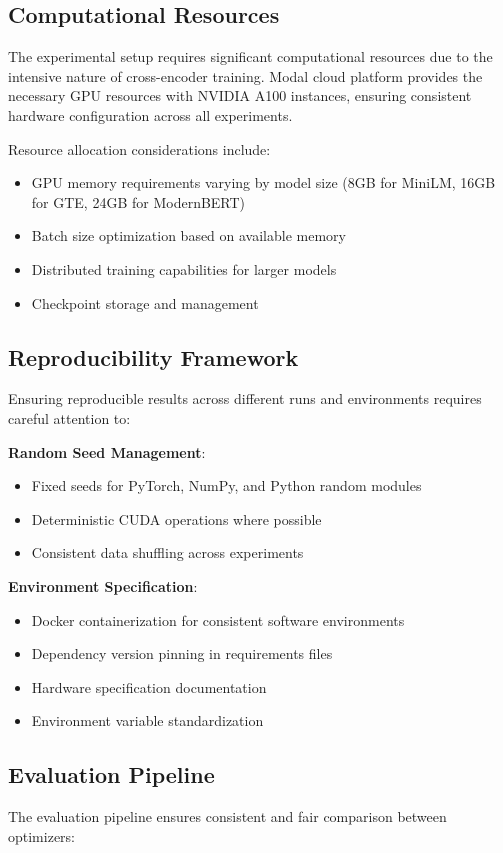 \subsection{Computational Resources}
The experimental setup requires significant computational resources due to the intensive nature of cross-encoder training. Modal cloud platform provides the necessary GPU resources with NVIDIA A100 instances, ensuring consistent hardware configuration across all experiments.

Resource allocation considerations include:
\begin{itemize}
    \item GPU memory requirements varying by model size (8GB for MiniLM, 16GB for GTE, 24GB for ModernBERT)
    \item Batch size optimization based on available memory
    \item Distributed training capabilities for larger models
    \item Checkpoint storage and management
\end{itemize}

\subsection{Reproducibility Framework}
Ensuring reproducible results across different runs and environments requires careful attention to:

\textbf{Random Seed Management}:
\begin{itemize}
    \item Fixed seeds for PyTorch, NumPy, and Python random modules
    \item Deterministic CUDA operations where possible
    \item Consistent data shuffling across experiments
\end{itemize}

\textbf{Environment Specification}:
\begin{itemize}
    \item Docker containerization for consistent software environments
    \item Dependency version pinning in requirements files
    \item Hardware specification documentation
    \item Environment variable standardization
\end{itemize}

\subsection{Evaluation Pipeline}
The evaluation pipeline ensures consistent and fair comparison between optimizers:

